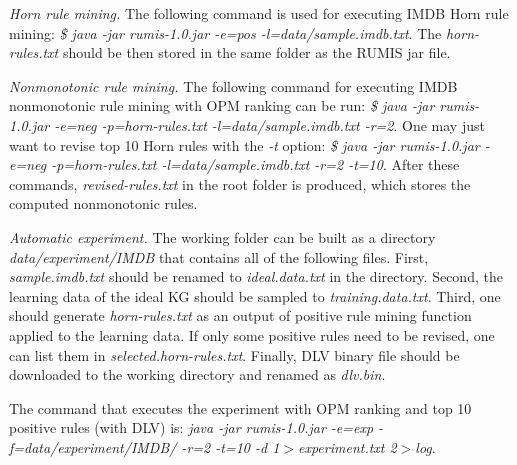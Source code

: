 \textit{Horn rule mining.} The following command is used for executing IMDB Horn rule mining: \textit{\$ java -jar rumis-1.0.jar -e=pos -l=data/sample.imdb.txt}. The \textit{horn-rules.txt} should be then stored in the same folder as the RUMIS jar file.

\textit{Nonmonotonic rule mining.} The following command for executing IMDB nonmonotonic rule mining with OPM ranking can be run: \textit{\$ java -jar rumis-1.0.jar -e=neg -p=horn-rules.txt -l=data/sample.imdb.txt -r=2}. One may just want to revise top 10 Horn rules with the \textit{-t} option: \textit{\$ java -jar rumis-1.0.jar -e=neg -p=horn-rules.txt -l=data/sample.imdb.txt -r=2 -t=10}. After these commands, \textit{revised-rules.txt} in the root folder is produced, which stores the computed nonmonotonic rules.

\textit{Automatic experiment.} The working folder can be built as a directory \textit{data/experiment/IMDB} that contains all of the following files. First, \textit{sample.imdb.txt} should be renamed to \textit{ideal.data.txt} in the directory. Second, the learning data of the ideal KG should be sampled to \textit{training.data.txt}. Third, one should generate \textit{horn-rules.txt} as an output of positive rule mining function applied to the learning data. If only some positive rules need to be revised, one can list them in \textit{selected.horn-rules.txt}. Finally, DLV binary file should be downloaded to the working directory and renamed as \textit{dlv.bin}.

The command that executes the experiment with OPM ranking and top 10 positive rules (with DLV) is: \textit{java -jar rumis-1.0.jar -e=exp -f=data/experiment/IMDB/ -r=2 -t=10 -d 1$>$experiment.txt 2$>$log}.

